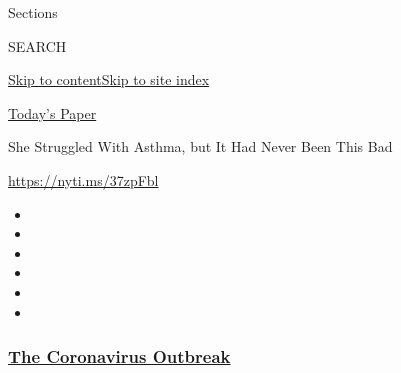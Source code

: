 Sections

SEARCH

\protect\hyperlink{site-content}{Skip to
content}\protect\hyperlink{site-index}{Skip to site index}

\href{https://myaccount.nytimes3xbfgragh.onion/auth/login?response_type=cookie\&client_id=vi}{}

\href{https://www.nytimes3xbfgragh.onion/section/todayspaper}{Today's
Paper}

She Struggled With Asthma, but It Had Never Been This Bad

\url{https://nyti.ms/37zpFbl}

\begin{itemize}
\item
\item
\item
\item
\item
\item
\end{itemize}

\hypertarget{the-coronavirus-outbreak}{%
\subsubsection{\texorpdfstring{\href{https://www.nytimes3xbfgragh.onion/news-event/coronavirus?name=styln-coronavirus-national\&region=TOP_BANNER\&block=storyline_menu_recirc\&action=click\&pgtype=Article\&impression_id=81441c30-f1c4-11ea-9f8d-c5c4a80db310\&variant=undefined}{The
Coronavirus
Outbreak}}{The Coronavirus Outbreak}}\label{the-coronavirus-outbreak}}

